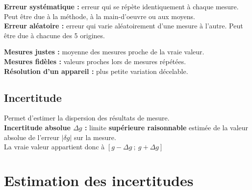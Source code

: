 \documentclass[13pt, twoside, a4paper, french]{report}
\begin{document}
      \begin{minipage}[t]{0.50\textwidth}%
        \textbf{Erreur systématique :} erreur qui se répète identiquement à chaque mesure.
        Peut être due à la méthode, à la main-d'oeuvre ou aux moyens.\\
        
        \textbf{Erreur aléatoire :} erreur qui varie aléatoirement d'une mesure à l'autre.
        Peut être due à chacune des 5 origines.
      \end{minipage}\hspace{0.03\textwidth}
      \begin{minipage}[t]{0.47\textwidth}%
        \textbf{Mesures justes :} moyenne des mesures proche de la vraie valeur.\\
        \textbf{Mesures fidèles :} valeurs proches lors de mesures répétées.\\
        \textbf{Résolution d’un appareil :} plus petite variation décelable.
      \end{minipage}
    
    \subsection{Incertitude}\label{subsec:incertitude}
      
      Permet d’estimer la dispersion des résultats de mesure.\\
      
      \textbf{Incertitude absolue $\Delta g$ :} limite \textbf{supérieure raisonnable} estimée de la valeur absolue de l’erreur $\lvert \delta g \rvert$ sur la mesure.\\ La vraie valeur appartient donc à $[g - \Delta g\ ;\ g + \Delta g]$
  

  \section{Estimation des incertitudes}\label{sec:estimation-des-incertitudes}
    
\end{document}
